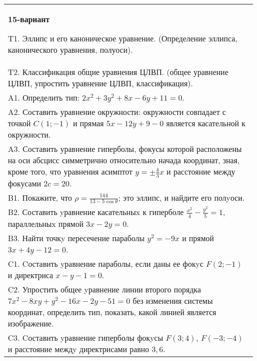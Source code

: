 \documentclass{article}
\begin{document}
\begin{tabular}{m{17cm}}
\textbf{15-вариант}
\newline

T1. Эллипс и его каноническое уравнение. (Определение эллипса, канонического уравнения, полуоси).\\

T2. Классификация общие уравнения ЦЛВП. (общее уравнение ЦЛВП, упростить уравнение ЦЛВП, классификация).\\

A1. Определить тип: $2x^{2}+3y^{2}+8x-6y+11=0$.\\

A2. Составить уравнение окружности: окружности совпадает с точкой $C(1;-1)$ и прямая $5x-12y+9-0$ является касательной к окружности.\\

A3. Составить уравнение гиперболы, фокусы которой расположены на оси абсцисс симметрично относительно начада координат, зная, кроме того, что уравнения асимптот $y=\pm \frac{4}{3}x$ и расстояние между фокусами $2c=20$.\\

B1. Покажите, что $\rho = \frac{144}{13 - 5\cos\theta}$; это эллипс, и найдите его полyоси.\\

B2. Составить yравнение касательныx к гиперболе $\frac{x^{2}}{4} - \frac{y^{2}}{5} = 1$, параллельныx прямой $3x - 2y = 0$.  \\

B3. Найти точкy пересечение параболы $y^{2} = - 9x$ и прямой $3x + 4y - 12 = 0$.  \\

C1. Cоставить yравнение параболы, если даны ее фокyс $F(2;-1)$ и директриса $x-y-1=0$.  \\

C2. Упростить общее yравнение линии второго порядка $7x^{2}-8xy+y^{2}-16x-2y-51=0$ без изменения системы координат, определить тип, показать, какой линией является изображение.\\

C3. Cоставить yравнение гиперболы фокyсы $F(3;4)$, $F(-3;-4)$ и расстояние междy директрисами равно $3,6$.  \\

\end{tabular}
\vspace{1cm}
\end{document}
